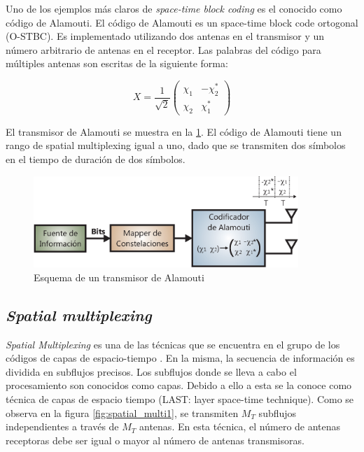 Uno de los ejemplos más claros de \textit{space-time block coding} es el conocido como código de Alamouti. El código de Alamouti es un space-time block code ortogonal (O-STBC). Es implementado utilizando dos antenas en el transmisor y un número arbitrario de antenas en el receptor. Las palabras del código para múltiples antenas son escritas de la siguiente forma:

\begin{equation}
X = \frac{1}{\sqrt{2}}
\left( \begin{array}{cc}
\chi_1 & -\chi_2^* \\
\chi_2 & \chi_1^* \end{array} \right)
\end{equation}

El transmisor de Alamouti se muestra en la \ref{fig:alamouti}. El código de Alamouti tiene un rango de spatial multiplexing igual a uno, dado que se transmiten dos símbolos en el tiempo de duración de dos símbolos.

\begin{figure}[htb!]
        \centering
        \includegraphics[width=10cm]{./figures/C02-alamouti}
        \caption{Esquema de un transmisor de Alamouti}
        \label{fig:alamouti}
\end{figure}

\subsection{\textit{Spatial multiplexing}}

\textit{Spatial Multiplexing} es una de las técnicas que se encuentra en el grupo de los códigos de capas de espacio-tiempo \cite{Mohammadi2}. En la misma, la secuencia de información es dividida en subflujos precisos. Los subflujos donde se lleva a cabo el procesamiento son conocidos como capas. Debido a ello a esta se la conoce como técnica de capas de espacio tiempo (LAST: layer space-time technique). Como se observa en la figura \ref{fig:spatial_multi1}, se transmiten $M_T$ subflujos independientes a través de $M_T$ antenas. En esta técnica, el número de antenas receptoras debe ser igual o mayor al número de antenas transmisoras.

